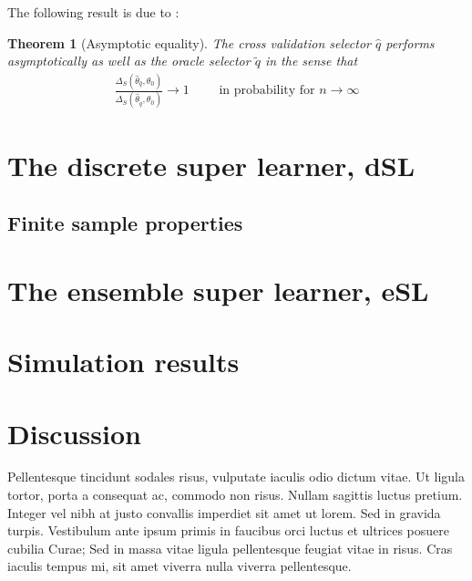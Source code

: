 \documentclass[11pt, a4paper]{article}
\newtheorem{theorem}{Theorem}
\theoremstyle{definition}
\theoremstyle{remark}
\newcommand{\cl}{q}
\begin{document}
The following result is due to \cite{laan03}: 
\begin{theorem}[Asymptotic equality]
    The cross validation selector $ \hat{\cl} $ performs asymptotically as well as the oracle selector $ \tilde{\cl} $ in the sense that 
    \begin{align*}
        \frac{\Delta_{S}( \hat{\theta}_{ \hat{\cl} } , \theta_0 )}{ \Delta_{S}( \hat{\theta}_{ \tilde{\cl} } , \theta_0) } \to 1 \qquad \text{ in probability for } n \to \infty
    \end{align*}
\end{theorem}


\section{The discrete super learner, dSL}

\subsection{Finite sample properties}

\section{The ensemble super learner, eSL}
\section{Simulation results}
\section{Discussion}
Pellentesque tincidunt sodales risus, vulputate iaculis odio dictum vitae. Ut ligula tortor, porta a consequat ac, commodo non risus. Nullam sagittis luctus pretium. Integer vel nibh at justo convallis imperdiet sit amet ut lorem. Sed in gravida turpis. Vestibulum ante ipsum primis in faucibus orci luctus et ultrices posuere cubilia Curae; Sed in massa vitae ligula pellentesque feugiat vitae in risus. Cras iaculis tempus mi, sit amet viverra nulla viverra pellentesque.
\end{document}
